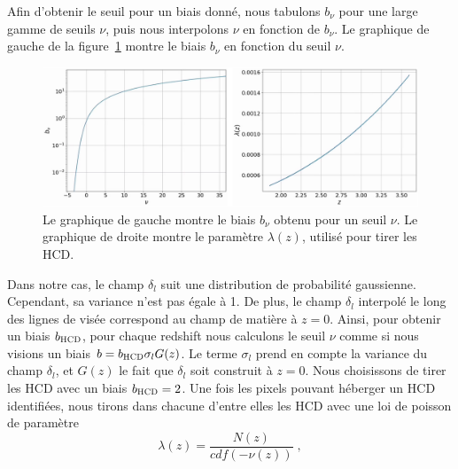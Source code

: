 Afin d'obtenir le seuil pour un biais donné, nous tabulons $b_{\nu}$ pour une large gamme de seuils $\nu$, puis nous interpolons  $\nu$ en fonction de $b_{\nu}$.
  Le graphique de gauche de la figure~\ref{fig:bnu_lambda} montre le biais $b_{\nu}$ en fonction du seuil $\nu$.
\begin{figure}
  \centering
  \includegraphics[scale=0.42]{bnu_lambda}
  \caption{Le graphique de gauche montre le biais $b_{\nu}$ obtenu pour un seuil $\nu$. Le graphique de droite montre le paramètre $\lambda(z)$, utilisé pour tirer les HCD.}
  \label{fig:bnu_lambda}
\end{figure}
Dans notre cas, le champ $\delta_l$ suit une distribution de probabilité gaussienne. Cependant, sa variance n'est pas égale à 1. De plus, le champ $\delta_l$ interpolé le long des lignes de visée correspond au champ de matière à $z=0$. Ainsi, pour obtenir un biais $b_{\textsc{HCD}}$, pour chaque redshift nous  calculons le seuil $\nu$ comme si nous visions un biais $b = b_{\textsc{HCD}} \sigma_l G(z)$. Le terme $\sigma_l$ prend en compte la variance du champ $\delta_l$, et $G(z)$ le fait que $\delta_l$ soit construit à $z=0$. Nous choisissons de tirer les HCD avec un biais $b_{\textsc{HCD}} = 2$.
Une fois les pixels pouvant héberger un HCD identifiées, nous tirons dans chacune d'entre elles les HCD avec une loi de poisson de paramètre
\begin{equation}
  \lambda(z) = \frac{N(z)}{cdf(-\nu(z))} \; ,
\end{equation}
